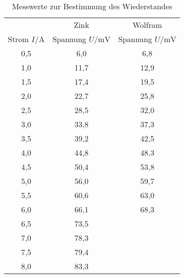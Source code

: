\begin{table}
  \centering
  \caption{Messwerte zur Bestimmung des Wiederstandes }
  \label{tab:R}
  \begin{tabular}{c c c}
    \toprule
                       &     Zink                        & Wolfram\\
Strom $I/\si{\ampere}$ & Spannung $U/\si{\milli\volt}$  & Spannung $U/\si{\milli\volt}$ \\
    \midrule
    0,5   &  6,0  &  6,8\\
    1,0   &  11,7 &  12,9\\
    1,5   &  17,4 &  19,5\\
    2,0   &  22,7  &  25,8\\
    2,5   &  28,5  &  32,0\\
    3,0   &  33,8  &  37,3\\
    3,5   &  39,2  &  42,5\\
    4,0   &  44,8  &  48,3\\
    4,5   &  50,4  &  53,8\\
    5,0   &  56,0  &  59,7\\
    5,5   &  60,6  &  63,0\\
    6,0   &  66,1  &  68,3\\
    6,5   &  73,5  &\\
    7,0   &  78,3  &\\
    7,5   &  79,4  &\\
    8,0   &  83,3  &\\
   \bottomrule
  \end{tabular}
\end{table}
\FloatBarrier

